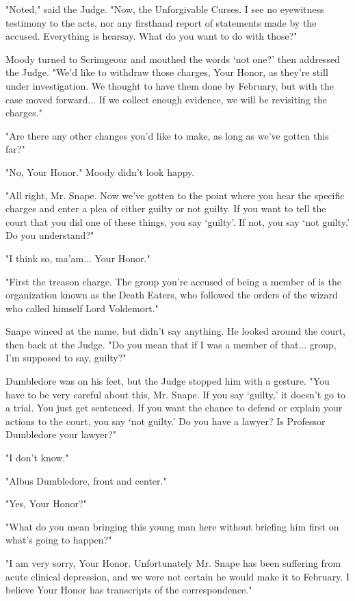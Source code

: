 \documentclass[a4paper,11pt]{article}
\begin{document}
"Noted," said the Judge. "Now, the Unforgivable Curses. I see no eyewitness testimony to the acts, nor any firsthand report of statements made by the accused. Everything is hearsay. What do you want to do with those?"

Moody turned to Scrimgeour and mouthed the words `not one?' then addressed the Judge. "We'd like to withdraw those charges, Your Honor, as they're still under investigation. We thought to have them done by February, but with the case moved forward... If we collect enough evidence, we will be revisiting the charges."

"Are there any other changes you'd like to make, as long as we've gotten this far?"

"No, Your Honor." Moody didn't look happy.

"All right, Mr. Snape. Now we've gotten to the point where you hear the specific charges and enter a plea of either guilty or not guilty. If you want to tell the court that you did one of these things, you say `guilty'. If not, you say `not guilty.' Do you understand?"

"I think so, ma'am... Your Honor."

"First the treason charge. The group you're accused of being a member of is the organization known as the Death Eaters, who followed the orders of the wizard who called himself Lord Voldemort."

Snape winced at the name, but didn't say anything. He looked around the court, then back at the Judge. "Do you mean that if I was a member of that... group, I'm supposed to say, guilty?"

Dumbledore was on his feet, but the Judge stopped him with a gesture. "You have to be very careful about this, Mr. Snape. If you say `guilty,' it doesn't go to a trial. You just get sentenced. If you want the chance to defend or explain your actions to the court, you say `not guilty.' Do you have a lawyer? Is Professor Dumbledore your lawyer?"

"I don't know."

"Albus Dumbledore, front and center."

"Yes, Your Honor?"

"What do you mean bringing this young man here without briefing him first on what's going to happen?"

"I am very sorry, Your Honor. Unfortunately Mr. Snape has been suffering from acute clinical depression, and we were not certain he would make it to February. I believe Your Honor has transcripts of the correspondence."
\end{document}
